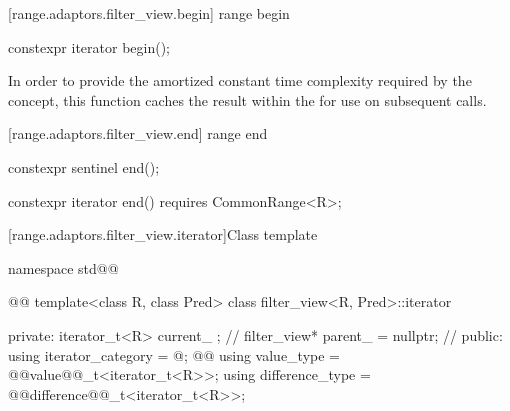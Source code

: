 {[range.adaptors.filter_view.begin]{ range begin}

%
\begin{itemdecl}
constexpr iterator begin();
\end{itemdecl}

\begin{itemdescr}
\pnum
{} \newtxt{\returns}

\pnum
\remarks In order to provide the amortized constant time complexity required by
the  concept, this function caches the result within the
 for use on subsequent calls.
\end{itemdescr}

[range.adaptors.filter_view.end]{ range end}

%
\begin{itemdecl}
constexpr sentinel end();
\end{itemdecl}

\begin{itemdescr}
\pnum
\oldtxt{\returns} 
\end{itemdescr}

\begin{itemdecl}
constexpr iterator end() requires CommonRange<R>;
\end{itemdecl}

\begin{itemdescr}
\pnum
\oldtxt{\returns} 
\end{itemdescr}

[range.adaptors.filter_view.iterator]{Class template }

%
\begin{codeblock}
namespace std@@ { @@
  template<class R, class Pred>
  class filter_view<R, Pred>::iterator {
  private:
    iterator_t<R> current_ {};           // \expos
    filter_view* parent_ = nullptr;      // \expos
  public:
    using iterator_category = @\seebelownc@;
    @@
    using value_type        = @@value@@_t<iterator_t<R>>;
    using difference_type   = @@difference@@_t<iterator_t<R>>;

}}
\end{codeblock}}
